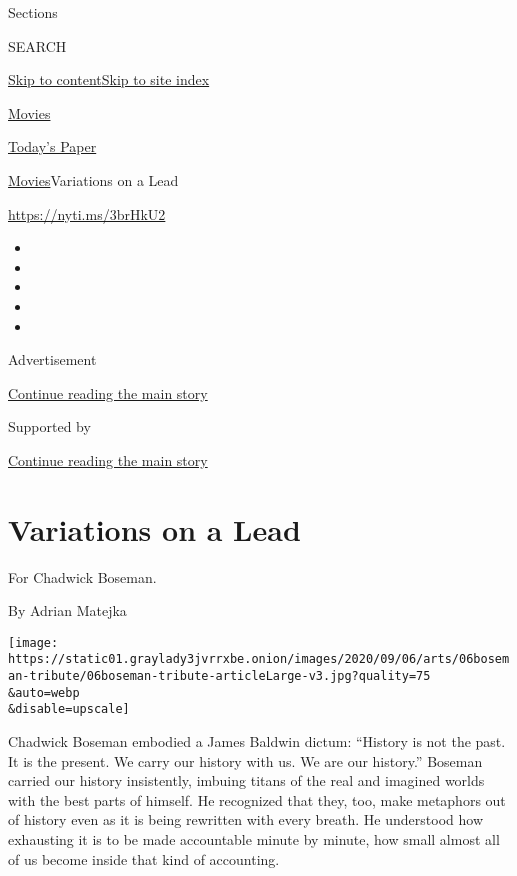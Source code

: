 Sections

SEARCH

\protect\hyperlink{site-content}{Skip to
content}\protect\hyperlink{site-index}{Skip to site index}

\href{https://www.nytimes3xbfgragh.onion/section/movies}{Movies}

\href{https://myaccount.nytimes3xbfgragh.onion/auth/login?response_type=cookie\&client_id=vi}{}

\href{https://www.nytimes3xbfgragh.onion/section/todayspaper}{Today's
Paper}

\href{/section/movies}{Movies}\textbar{}Variations on a Lead

\url{https://nyti.ms/3brHkU2}

\begin{itemize}
\item
\item
\item
\item
\item
\end{itemize}

Advertisement

\protect\hyperlink{after-top}{Continue reading the main story}

Supported by

\protect\hyperlink{after-sponsor}{Continue reading the main story}

\hypertarget{variations-on-a-lead}{%
\section{Variations on a Lead}\label{variations-on-a-lead}}

For Chadwick Boseman.

By Adrian Matejka

\texttt{[image: https://static01.graylady3jvrrxbe.onion/images/2020/09/06/arts/06boseman-tribute/06boseman-tribute-articleLarge-v3.jpg?quality=75\\\&auto=webp\\\&disable=upscale]}

Chadwick Boseman embodied a James Baldwin dictum: ``History is not the
past. It is the present. We carry our history with us. We are our
history.'' Boseman carried our history insistently, imbuing titans of
the real and imagined worlds with the best parts of himself. He
recognized that they, too, make metaphors out of history even as it is
being rewritten with every breath. He understood how exhausting it is to
be made accountable minute by minute, how small almost all of us become
inside that kind of accounting.

